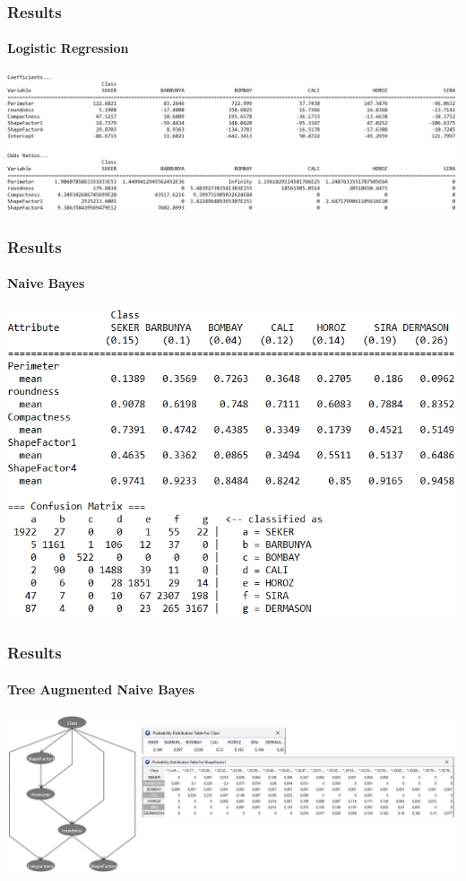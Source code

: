 \documentclass{beamer}
\begin{document}
\begin{frame}
\frametitle{Results}
\framesubtitle{Logistic Regression}
\centering
\includegraphics[width=\textwidth]{logistic}
\end{frame}

\begin{frame}
\frametitle{Results}
\framesubtitle{Naive Bayes}
\centering
\includegraphics[width=\textwidth]{naivebayes}
\end{frame}

\begin{frame}
\frametitle{Results}
\framesubtitle{Tree Augmented Naive Bayes}
\centering
\includegraphics[width=\textwidth]{TAN}
\end{frame}

\maketitle
\end{document}
